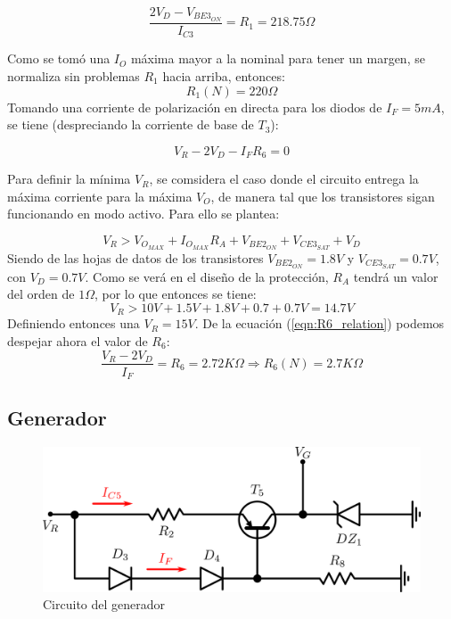 \[
\frac{2V_D - V_{{BE3}_{ON}}}{I_{C3}} = R_1 = 218.75\Omega
\]

Como se tom\'o una $I_O$ m\'axima mayor a la nominal para tener un margen, se normaliza sin problemas $R_1$ hacia arriba, entonces:
\[
R_1(N) = 220\Omega
\]
Tomando una corriente de polarizaci\'on en directa para los diodos de $I_F = 5mA$, se tiene (despreciando la corriente de base de $T_3$):

\begin{equation}
V_R - 2V_D - I_FR_6 = 0
\label{eqn:R6_relation}
\end{equation}

Para definir la m\'inima $V_R$, se comsidera el caso donde el circuito entrega la m\'axima corriente para la m\'axima $V_O$, de manera tal que los transistores sigan funcionando en modo activo. Para ello se plantea:

\[
V_R > V_{O_{MAX}} + I_{O_{MAX}}R_A + V_{BE2_{ON}} + V_{CE3_{SAT}} + V_D
\]
Siendo de las hojas de datos de los transistores $V_{BE2_{ON}} = 1.8V$ y $V_{CE3_{SAT}} = 0.7V$, con $V_D = 0.7V$. Como se ver\'a en el dise\~no de la protecci\'on, $R_A$ tendr\'a un valor del orden de $1\Omega$, por lo que entonces se tiene:
\[
V_R > 10V + 1.5V + 1.8V + 0.7 + 0.7V = 14.7V
\]
Definiendo entonces una $V_R = 15V$. De la ecuaci\'on (\ref{eqn:R6_relation}) podemos despejar ahora el valor de $R_6$:
\[
\frac{V_R - 2V_D}{I_F} = R_6 = 2.72K\Omega \Longrightarrow R_6(N) = 2.7K\Omega
\]

\subsection{Generador}

\begin{figure}[!ht]
\begin{centering}
\includegraphics[scale=0.34]{Imagenes/Generador.png}
\par\end{centering}
\caption{Circuito del generador}

\end{figure}

